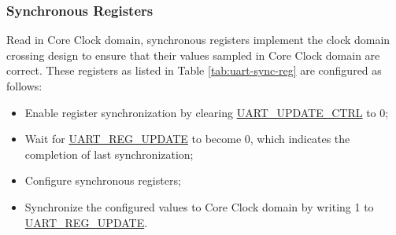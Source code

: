 \documentclass[main\_\_EN.tex]{subfiles}
\begin{document}
\subsubsection{Synchronous Registers}

Read in Core Clock domain, synchronous registers implement the clock domain crossing design to ensure that their values sampled in Core Clock domain are correct. These registers as listed in Table \ref{tab:uart-sync-reg} are configured as follows:

\begin{itemize}
    \item Enable register synchronization by clearing \hyperref[fielddesc:UARTUPDATECTRL]{UART\_UPDATE\_CTRL} to 0;
    \item Wait for \hyperref[fielddesc:UARTREGUPDATE]{UART\_REG\_UPDATE} to become 0, which indicates the completion of last synchronization;
    \item Configure synchronous registers;
    \item Synchronize the configured values to Core Clock domain by writing 1 to \hyperref[fielddesc:UARTREGUPDATE]{UART\_REG\_UPDATE}.
\end{itemize}
\end{document}
